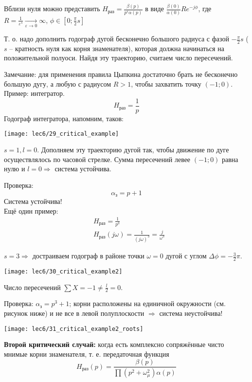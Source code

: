 \documentclass[main.tex]{subfiles}
\begin{document}
Вблизи нуля можно представить $ H_{\text{раз}} = \frac{\beta(p)}{p^s \alpha(p)}  $  в виде $ \frac{\beta(0)}{\alpha(0)} R e^{- j \phi} $, где $ R = \frac{1}{\varepsilon^s} \underset{\varepsilon \to 0}\to \infty $, $ \phi \in \left[ 0; \frac{\pi}{2}s \right] $

Т. о. надо дополнить годограф дугой бесконечно большого радиуса с фазой $ - \frac{\pi}{2}s $ ($ s $ -- кратность нуля как корня знаменателя), которая должна начинаться на положительной полуоси.
Найдя эту траекторию, считаем число пересечений.

Замечание: для применения правила Цыпкина достаточно брать не бесконечно большую дугу, а любую с радиусом $ R > 1 $, чтобы захватить точку $ (-1;0) $. \\

Пример: интегратор.
$$ H_{\text{раз}} = \frac{1}{p} $$
Годограф интегратора, напомним, таков:

\texttt{[image: lec6/29\_critical\_example]}

$ s = 1, l = 0 $.
Дополняем эту траекторию дугой так, чтобы движение по дуге осуществлялось по часовой стрелке.
Сумма пересечений левее $ (-1;0) $ равна нулю и $ l=0 \Rightarrow $ система устойчива.

Проверка:
$$ \alpha_{\text{з}} = p + 1 $$
Система устойчива! \\

Ещё один пример:
\begin{align*}
    & H_{\text{раз}} = \frac{1}{p^3} \\
    & H_{\text{раз}}(j \omega) = \frac{1}{(j \omega)^3} = \frac{j}{\omega^3}
\end{align*}

$ s = 3 \Rightarrow $ достраиваем годограф в районе точки $ \omega = 0 $ дугой с углом $ \Delta \phi = - \frac{3}{2}\pi $.

\texttt{[image: lec6/30\_critical\_example2]}

Число пересечений $ \sum X = -1 \ne \frac{l}{2} = 0 $.

Проверка: $ \alpha_{\text{з}} = p^3 + 1 $; корни расположены на единичной окружности (см. рисунок ниже) и не все в левой полуплоскости $ \Rightarrow $ система неустойчива!

\texttt{[image: lec6/31\_critical\_example2\_roots]}

\textbf{Второй критический случай:} когда есть комплексно сопряжённые чисто мнимые корни знаменателя, т. е. передаточная функция
$$ H_{\text{раз}}(p) = \frac{\beta(p)}{\prod(p^2 + \omega_\mu^2) \alpha(p)} $$
\end{document}
